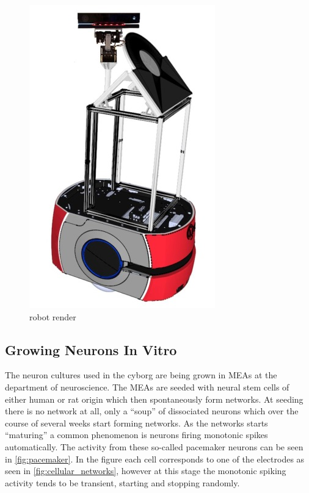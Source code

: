 \begin{figure}[h!]
    \includegraphics[width=\linewidth]{images/cyborg.jpg}
    \caption{robot render}
    \label{fig:cyborg}
\end{figure}
\subsection{Growing Neurons In Vitro}
The neuron cultures used in the cyborg are being grown in MEAs
at the department of neuroscience.
The MEAs are seeded with neural stem cells of either human or rat origin which
then spontaneously form networks.
At seeding there is no network at all, only a ``soup'' of dissociated neurons
which over the course of several weeks start forming networks.
As the networks starts ``maturing'' a common phenomenon is neurons firing
monotonic spikes automatically.
The activity from these so-called pacemaker neurons can be seen in \ref{fig:pacemaker}.
In the figure each cell corresponds to one of the electrodes as seen in
\ref{fig:cellular_networks}, however at this stage the monotonic spiking
activity tends to be transient, starting and stopping randomly.
